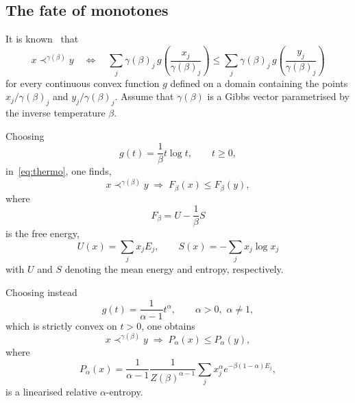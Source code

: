 \documentclass[11pt,a4paper,longbibliography]{amsart}
\numberwithin{equation}{section}
\theoremstyle{plain}
\theoremstyle{definition}
\theoremstyle{remark}
\begin{document}
	\subsection{The fate of monotones}
	It is known~\cite{vom2019d} that
	\begin{equation}
		\label{eq:thermo}
		x\prec^{\gamma(\beta)} y\quad\iff\quad \sum_j \gamma(\beta)_j\, g\!\left(\frac{x_j}{\gamma(\beta)_j}\right)
		\le
		\sum_j \gamma(\beta)_j\, g\!\left(\frac{y_j}{\gamma(\beta)_j}\right)
	\end{equation}
	for every continuous convex function $g$ defined on a domain containing the points
	$
	x_j/\gamma(\beta)_j
	$
	and
	$
	y_j/\gamma(\beta)_j
	$. Assume that $\gamma(\beta)$ is a Gibbs vector parametrised by the inverse temperature $\beta$.
	
	Choosing
	$$
	g(t)=\frac{1}{\beta}t\log t,
	\qquad t\ge0,
	$$
	in~\eqref{eq:thermo},
	one finds, 
	\begin{equation}
		x\prec^{\gamma(\beta)} y
		\;\Longrightarrow\;
		F_\beta(x)\le F_\beta(y),
	\end{equation}
	where
	$$
	F_\beta=U-\frac1\beta S
	$$
	is the free energy, 
	\begin{equation}
		U(x)=\sum_j x_j E_j,
		\qquad
		S(x)=-\sum_j x_j\log x_j
	\end{equation}
	with $U$ and $S$ denoting the mean energy and entropy, respectively.
	
	Choosing instead
	\begin{equation}
		g(t)
		=
		\frac{1}{\alpha-1}t^\alpha,
		\qquad
		\alpha>0,\,\, \alpha\neq 1,
	\end{equation}
	which is strictly convex on $t>0$, one obtains
	\begin{equation}
		x\prec^{\gamma(\beta)} y
		\;\Longrightarrow\;
		P_\alpha(x)\le P_\alpha(y),
	\end{equation}
	where
	\begin{equation}
		P_\alpha(x)
		=
		\frac{1}{\alpha-1}
		\frac{1}{Z(\beta)^{\alpha-1}}
		\sum_j x_j^\alpha e^{-\beta(1-\alpha)E_j},
	\end{equation}
	is a  linearised relative $\alpha$-entropy.
	
\end{document}
